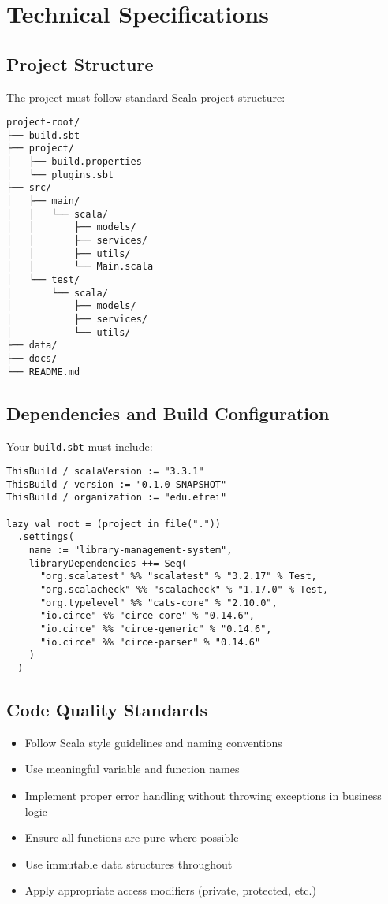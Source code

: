 \documentclass[11pt,a4paper]{article}
\begin{document}
\section{Technical Specifications}

\subsection{Project Structure}

The project must follow standard Scala project structure:

\begin{lstlisting}
project-root/
├── build.sbt
├── project/
│   ├── build.properties
│   └── plugins.sbt
├── src/
│   ├── main/
│   │   └── scala/
│   │       ├── models/
│   │       ├── services/
│   │       ├── utils/
│   │       └── Main.scala
│   └── test/
│       └── scala/
│           ├── models/
│           ├── services/
│           └── utils/
├── data/
├── docs/
└── README.md
\end{lstlisting}

\subsection{Dependencies and Build Configuration}

Your \texttt{build.sbt} must include:

\begin{lstlisting}
ThisBuild / scalaVersion := "3.3.1"
ThisBuild / version := "0.1.0-SNAPSHOT"
ThisBuild / organization := "edu.efrei"

lazy val root = (project in file("."))
  .settings(
    name := "library-management-system",
    libraryDependencies ++= Seq(
      "org.scalatest" %% "scalatest" % "3.2.17" % Test,
      "org.scalacheck" %% "scalacheck" % "1.17.0" % Test,
      "org.typelevel" %% "cats-core" % "2.10.0",
      "io.circe" %% "circe-core" % "0.14.6",
      "io.circe" %% "circe-generic" % "0.14.6",
      "io.circe" %% "circe-parser" % "0.14.6"
    )
  )
\end{lstlisting}

\subsection{Code Quality Standards}

\begin{itemize}
    \item Follow Scala style guidelines and naming conventions
    \item Use meaningful variable and function names
    \item Implement proper error handling without throwing exceptions in business logic
    \item Ensure all functions are pure where possible
    \item Use immutable data structures throughout
    \item Apply appropriate access modifiers (private, protected, etc.)
\end{itemize}
\end{document}
